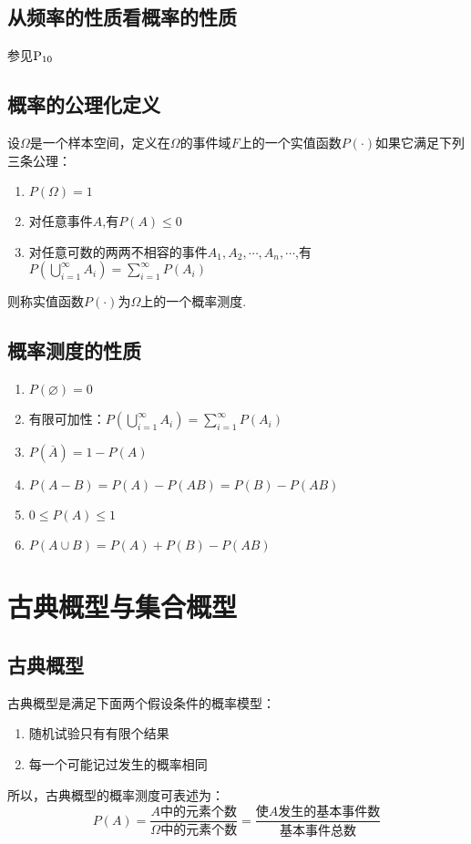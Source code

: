 \subsection{从频率的性质看概率的性质}
参见$\rm{P}_{10}$
\subsection{概率的公理化定义}
\sj
{}
设$\Omega $是一个样本空间，定义在$\Omega $的事件域$F$上的一个实值函数$P(\cdot)$如果它满足下列三条公理：
\begin{enumerate}[1.]
	\setlength{\itemindent}{4em}
	\setlength{\topsep}{0.01em}
	\setlength{\itemsep}{0.01em}
	\item $P(\Omega )=1$
	\item 对任意事件$A$,有$P(A) \le 0$
	\item 对任意可数的两两不相容的事件$A_1,A_2,\cdots,A_n,\cdots$,有$\displaystyle P\left( \bigcup_{i=1}^{\infty } A_i\right)=\sum_{i=1}^{\infty }P(A_i) $
\end{enumerate}
则称实值函数$P(\cdot)$为$\Omega $上的一个概率测度.\jg

\subsection{概率测度的性质}
\begin{enumerate}[1.]
	\setlength{\itemindent}{4em}
	\setlength{\topsep}{0.01em}
	\setlength{\itemsep}{0.01em}
	\item $P(\varnothing)=0$
	\item 有限可加性：$\displaystyle P\left( \bigcup_{i=1}^{\infty } A_i\right)=\sum_{i=1}^{\infty }P(A_i) $
	\item $P(\overline{A})=1-P(A)$
	\item $P(A-B)=P(A)-P(AB)=P(B)-P(AB)$
	\item $0\le P(A) \le 1$
	\item $P(A\cup B)=P(A)+P(B)-P(AB)$
\end{enumerate}

\section{古典概型与集合概型}
\subsection{古典概型}
\tdefination[古典概型]
古典概型是满足下面两个假设条件的概率模型：
\begin{enumerate}[1.]
	\setlength{\itemindent}{4em}
	\setlength{\topsep}{0.01em}
	\setlength{\itemsep}{0.01em}
	\item 随机试验只有有限个结果
	\item 每一个可能记过发生的概率相同
\end{enumerate}
所以，古典概型的概率测度可表述为：
\begin{equation}
P(A)=\frac{A\mbox{中的元素个数}}{\Omega \mbox{中的元素个数}}=\frac{\mbox{使}A\mbox{发生的基本事件数}}{\mbox{基本事件总数}}
\end{equation}

